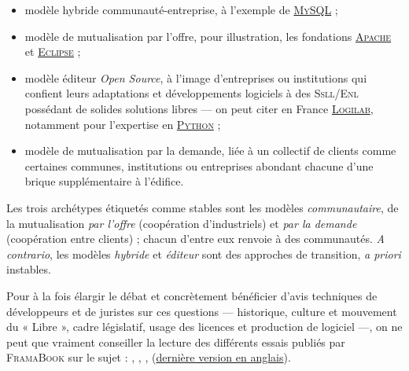 \begin{itemize}
	\item modèle hybride communauté-entreprise, à l'exemple de \href{https://www.mysql.com/fr/}{\textsc{MySQL}} ;
	\item modèle de mutualisation par l'offre, pour illustration, les fondations \href{https://www.apache.org/}{\textsc{Apache}} et \href{https://www.eclipse.org/}{\textsc{Eclipse}} ;
	\item modèle éditeur \textit{Open Source}, à l'image d'entreprises ou institutions qui confient leurs adaptations et développements logiciels à des \textsc{Ssll/Enl} possédant de solides solutions libres --- on peut citer en France \href{https://www.logilab.fr/}{\textsc{Logilab}}, notamment pour l'expertise en \href{https://www.python.org/}{\textsc{Python}} ;
	\item modèle de mutualisation par la demande, liée à un collectif de clients comme certaines communes, institutions ou entreprises abondant chacune d'une brique supplémentaire à l'édifice.
\end{itemize}
Les trois archétypes étiquetés comme stables sont les modèles \emph{communautaire}, de la mutualisation \emph{par l'offre} (coopération d'industriels) et \emph{par la demande} (coopération entre clients) ; chacun d'entre eux renvoie à des communautés. \textit{A contrario}, les modèles \emph{hybride} et \emph{éditeur} sont des approches de transition, \textit{a priori} instables.

Pour à la fois élargir le débat et concrètement bénéficier d'avis techniques de développeurs et de juristes sur ces questions --- historique, culture et mouvement du « Libre », cadre législatif, usage des licences et production de logiciel ---, on ne peut que vraiment conseiller la lecture des différents essais publiés par \textsc{FramaBook} sur le sujet : 
 \parencite{Paloque-Berges-Masutti:2013},  \parencite{Pintscheretal:2013},  \parencite{Jean:2011},  \parencite{Fogel:2012} (\href{https://producingoss.com/}{dernière version en anglais}).

